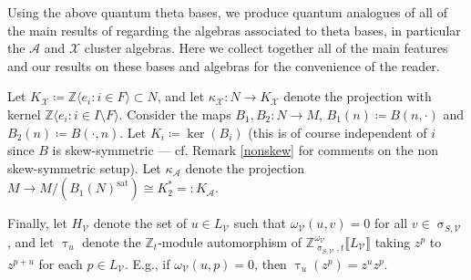 \documentclass{amsart}
\DeclareMathOperator{\sat}{sat}
\let\llb=\llbracket
\let\rrb=\rrbracket
\let\bb=\mathbb
\let\rar=\rightarrow
\let\s=\mathcal
\renewcommand{\sigma}{\upsigma}
\renewcommand{\tau}{\uptau}
\theoremstyle{plain}%
\newcommand{\Z}{{\mathbb Z}}
\theoremstyle{definition}
\theoremstyle{remark}
\begin{document}
Using the above quantum theta bases, we produce quantum analogues of all of the main results of \cite{GHKK} regarding the algebras associated to theta bases, in particular the $\s{A}$ and $\s{X}$ cluster algebras.  Here we collect together all of the main features and our results on these bases and algebras for the convenience of the reader.

Let $K_{\s{X}}\coloneqq \bb{Z}\langle e_i\colon i\in F\rangle\subset N$, and let $\kappa_{\s{X}} \colon N\rar K_{\s{X}}$ denote the projection with kernel $\bb{Z}\langle e_i\colon i\in I\setminus F\rangle$.  Consider the maps $B_1,B_2\colon N\rar M$, $B_1(n)\coloneqq  B(n,\cdot)$ and $B_2(n)\coloneqq B(\cdot,n)$.  Let $K_i\coloneqq \ker(B_i)$ (this is of course independent of $i$ since $B$ is skew-symmetric --- cf. Remark \ref{nonskew} for comments on the non skew-symmetric setup).  Let $\kappa_{\s{A}}$ denote the projection $M\rar M/(B_1(N)^{\sat})\cong K_2^*=:K_{\s{A}}$.

Finally, let $H_{\s{V}}$ denote the set of $u\in L_{\s{V}}$ such that $\omega_{\s{V}}(u,v)=0$ for all $v\in \sigma_{S,\s{V}}$, and let $\tau_u$ denote the $\Z_t$-module automorphism of $\Z_{\sigma_{S,\s{V}},t}^{\omega_{\s{V}}}\llb L_{\s{V}}\rrb$ taking $z^p$ to $z^{p+u}$ for each $p\in L_{\s{V}}$.  E.g., if $\omega_{\s{V}}(u,p)=0$, then $\tau_u(z^p)=z^uz^p$.
\end{document}
